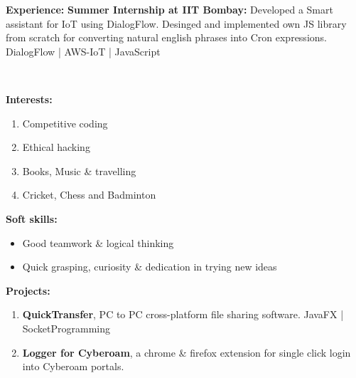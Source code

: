 \documentclass[11pt]{article}
\begin{document}
\begin{center}
\begin{minipage}[t]{0.35\textwidth}
            \begin{LARGE}
				\textbf{Experience:}\medskip%
				{\small
					\vspace{0.2cm}
					\newline
					\textbf{Summer Internship at IIT Bombay:}
					\newline
					Developed a Smart assistant for IoT using DialogFlow. Desinged and implemented own JS library from scratch for converting natural english phrases into Cron expressions.
					\medskip
					\\DialogFlow | AWS-IoT | JavaScript
				}
			\end{LARGE}
			\\\vspace{0.6cm}
            \begin{LARGE}
				\textbf{Interests:}\smallskip%
				{\small
					\begin{enumerate}[leftmargin=*,label=-]
						\item Competitive coding
						\item Ethical hacking
						\item Books, Music \& travelling
						\item Cricket, Chess and Badminton
					\end{enumerate}
				}
			\end{LARGE}
			\vspace{0.5cm}
			\begin{LARGE}
				\textbf{Soft skills:}\smallskip%
				{\small
					\begin{itemize}[leftmargin=*]
						\item Good teamwork \& logical thinking
						\item Quick grasping, curiosity \& dedication in trying new ideas
					\end{itemize}
				}
			\end{LARGE}
		\end{minipage}%
		\hspace{0.55cm}
		\begin{minipage}[t]{0.6\textwidth}
			\raggedright\smallskip
			\begin{LARGE}
				\textbf{Projects:}\medskip%
				{\small
					\begin{enumerate}
						\item \textbf{QuickTransfer}, PC to PC cross-platform file sharing software.\linebreak
						JavaFX | SocketProgramming
						\item \textbf{Logger for Cyberoam}, a chrome \& firefox extension for single click login into Cyberoam portals.\linebreak

\end{enumerate}}
\end{LARGE}
\end{minipage}
\end{center}
\end{document}
